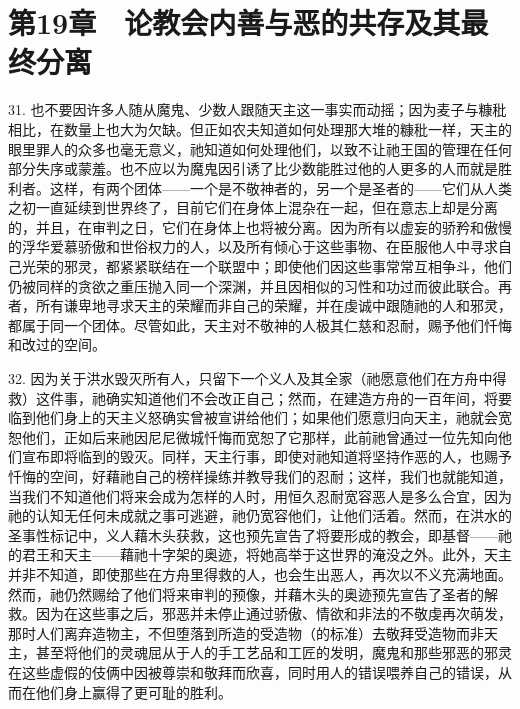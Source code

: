 
\section{第19章　论教会内善与恶的共存及其最终分离}

31. 也不要因许多人随从魔鬼、少数人跟随天主这一事实而动摇；因为麦子与糠秕相比，在数量上也大为欠缺。但正如农夫知道如何处理那大堆的糠秕一样，天主的眼里罪人的众多也毫无意义，祂知道如何处理他们，以致不让祂王国的管理在任何部分失序或蒙羞。也不应以为魔鬼因引诱了比少数能胜过他的人更多的人而就是胜利者。这样，有两个团体——一个是不敬神者的，另一个是圣者的——它们从人类之初一直延续到世界终了，目前它们在身体上混杂在一起，但在意志上却是分离的，并且，在审判之日，它们在身体上也将被分离。因为所有以虚妄的骄矜和傲慢的浮华爱慕骄傲和世俗权力的人，以及所有倾心于这些事物、在臣服他人中寻求自己光荣的邪灵，都紧紧联结在一个联盟中；即使他们因这些事常常互相争斗，他们仍被同样的贪欲之重压抛入同一个深渊，并且因相似的习性和功过而彼此联合。再者，所有谦卑地寻求天主的荣耀而非自己的荣耀，并在虔诚中跟随祂的人和邪灵，都属于同一个团体。尽管如此，天主对不敬神的人极其仁慈和忍耐，赐予他们忏悔和改过的空间。\par

32. 因为关于洪水毁灭所有人，只留下一个义人及其全家（祂愿意他们在方舟中得救）这件事，祂确实知道他们不会改正自己；然而，在建造方舟的一百年间，将要临到他们身上的天主义怒确实曾被宣讲给他们；如果他们愿意归向天主，祂就会宽恕他们，正如后来祂因尼尼微城忏悔而宽恕了它那样，此前祂曾通过一位先知向他们宣布即将临到的毁灭。同样，天主行事，即使对祂知道将坚持作恶的人，也赐予忏悔的空间，好藉祂自己的榜样操练并教导我们的忍耐；这样，我们也就能知道，当我们不知道他们将来会成为怎样的人时，用恒久忍耐宽容恶人是多么合宜，因为祂的认知无任何未成就之事可逃避，祂仍宽容他们，让他们活着。然而，在洪水的圣事性标记中，义人藉木头获救，这也预先宣告了将要形成的教会，即基督——祂的君王和天主——藉祂十字架的奥迹，将她高举于这世界的淹没之外。此外，天主并非不知道，即使那些在方舟里得救的人，也会生出恶人，再次以不义充满地面。然而，祂仍然赐给了他们将来审判的预像，并藉木头的奥迹预先宣告了圣者的解救。因为在这些事之后，邪恶并未停止通过骄傲、情欲和非法的不敬虔再次萌发，那时人们离弃造物主，不但堕落到所造的受造物（的标准）去敬拜受造物而非天主，甚至将他们的灵魂屈从于人的手工艺品和工匠的发明，魔鬼和那些邪恶的邪灵在这些虚假的伎俩中因被尊崇和敬拜而欣喜，同时用人的错误喂养自己的错误，从而在他们身上赢得了更可耻的胜利。\par

